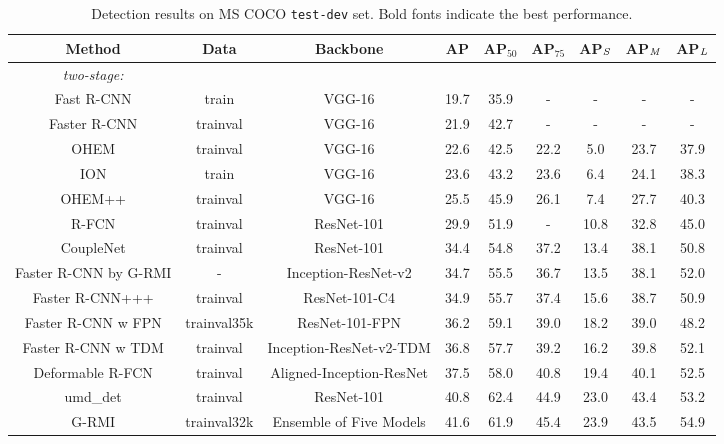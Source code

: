\documentclass[10pt,twocolumn,letterpaper]{article}
\begin{document}
\begin{table*}[t]
\centering
\caption{Detection results on MS COCO {\tt test-dev} set. Bold fonts indicate the best performance.}
\footnotesize \setlength{\tabcolsep}{9.5pt}
\begin{threeparttable}
\begin{tabular}{c|c|c|ccc|ccc}
\toprule[1.5pt]
Method &Data &Backbone &AP &AP$_{50}$ &AP$_{75}$ &AP$_{\it S}$ &AP$_{\it M}$ &AP$_{\it L}$\\
\hline
\textit{two-stage:} & & & & & & & & \\
Fast R-CNN \cite{DBLP:conf/iccv/Girshick15} &train &VGG-16 &19.7 &35.9 &- &- &- &- \\
Faster R-CNN \cite{DBLP:journals/pami/RenHG017} &trainval &VGG-16 &21.9 &42.7 &- &- &- &- \\
OHEM \cite{DBLP:conf/cvpr/ShrivastavaGG16} &trainval &VGG-16 &22.6 &42.5 &22.2 &5.0 &23.7 &37.9 \\
ION \cite{DBLP:conf/cvpr/BellZBG16} &train &VGG-16 &23.6 &43.2 &23.6 &6.4 &24.1 &38.3\\
OHEM++ \cite{DBLP:conf/cvpr/ShrivastavaGG16} &trainval &VGG-16 &25.5 &45.9 &26.1 &7.4 &27.7 &40.3 \\
R-FCN \cite{DBLP:conf/nips/DaiLHS16} &trainval &ResNet-101 &29.9 &51.9 &- &10.8 &32.8 &45.0\\
CoupleNet \cite{DBLP:conf/iccv/abs-1708-02863} &trainval &ResNet-101 &34.4 &54.8 &37.2 &13.4 &38.1 &50.8 \\
Faster R-CNN by G-RMI \cite{DBLP:conf/cvpr/HuangRSZKFFWSG016} &- &Inception-ResNet-v2\cite{DBLP:conf/aaai/SzegedyIVA17} &34.7 &55.5 &36.7 &13.5 &38.1 &52.0 \\
Faster R-CNN+++ \cite{DBLP:conf/cvpr/HeZRS16} &trainval &ResNet-101-C4 &34.9 &55.7 &37.4 &15.6 &38.7 &50.9\\
Faster R-CNN w FPN \cite{DBLP:conf/cvpr/LinDGHHB17} &trainval35k &ResNet-101-FPN &36.2 &59.1 &39.0 &18.2 &39.0 &48.2 \\
Faster R-CNN w TDM \cite{DBLP:journals/corr/ShrivastavaSMG16} &trainval &Inception-ResNet-v2-TDM &36.8 &57.7 &39.2 &16.2 &39.8 &52.1 \\
Deformable R-FCN \cite{DBLP:conf/iccv/DaiQXLZHW17} &trainval &Aligned-Inception-ResNet &37.5 &58.0 &40.8 &19.4 &40.1 &52.5 \\
umd\_det \cite{DBLP:conf/iccv/BodlaSCD17}                         &trainval      &ResNet-101     &40.8 &62.4 &44.9 &23.0 &43.4 &53.2 \\
G-RMI \cite{DBLP:conf/cvpr/HuangRSZKFFWSG016} &trainval32k &Ensemble of Five Models &41.6 &61.9 &45.4 &23.9 &43.5 &54.9 \\

\end{tabular}
\end{threeparttable}
\end{table*}
\end{document}

